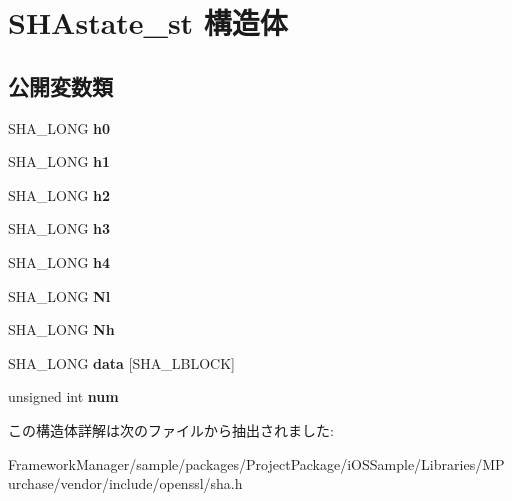 \hypertarget{struct_s_h_astate__st}{}\section{S\+H\+Astate\+\_\+st 構造体}
\label{struct_s_h_astate__st}
\subsection*{公開変数類}
\begin{DoxyCompactItemize}
\item 
\hypertarget{struct_s_h_astate__st_ab3041c8fb56553e66f5e96bea583181c}{}S\+H\+A\+\_\+\+L\+O\+N\+G {\bfseries h0}\label{struct_s_h_astate__st_ab3041c8fb56553e66f5e96bea583181c}

\item 
\hypertarget{struct_s_h_astate__st_aae63de503961d0e23ec45fadbf762a28}{}S\+H\+A\+\_\+\+L\+O\+N\+G {\bfseries h1}\label{struct_s_h_astate__st_aae63de503961d0e23ec45fadbf762a28}

\item 
\hypertarget{struct_s_h_astate__st_a553b3daa14d04597c861e2482d984761}{}S\+H\+A\+\_\+\+L\+O\+N\+G {\bfseries h2}\label{struct_s_h_astate__st_a553b3daa14d04597c861e2482d984761}

\item 
\hypertarget{struct_s_h_astate__st_a5219d68f2bee6867f2775d467691ad24}{}S\+H\+A\+\_\+\+L\+O\+N\+G {\bfseries h3}\label{struct_s_h_astate__st_a5219d68f2bee6867f2775d467691ad24}

\item 
\hypertarget{struct_s_h_astate__st_abd5013d45dc77b9f31df5818e02c80d1}{}S\+H\+A\+\_\+\+L\+O\+N\+G {\bfseries h4}\label{struct_s_h_astate__st_abd5013d45dc77b9f31df5818e02c80d1}

\item 
\hypertarget{struct_s_h_astate__st_abe78332975c3f20418c6a32381904bba}{}S\+H\+A\+\_\+\+L\+O\+N\+G {\bfseries Nl}\label{struct_s_h_astate__st_abe78332975c3f20418c6a32381904bba}

\item 
\hypertarget{struct_s_h_astate__st_aedd943b5d71b31cb22d3a7fecf05575e}{}S\+H\+A\+\_\+\+L\+O\+N\+G {\bfseries Nh}\label{struct_s_h_astate__st_aedd943b5d71b31cb22d3a7fecf05575e}

\item 
\hypertarget{struct_s_h_astate__st_ae8c8b0b2b3c60370a97459696f93e9da}{}S\+H\+A\+\_\+\+L\+O\+N\+G {\bfseries data} \mbox{[}S\+H\+A\+\_\+\+L\+B\+L\+O\+C\+K\mbox{]}\label{struct_s_h_astate__st_ae8c8b0b2b3c60370a97459696f93e9da}

\item 
\hypertarget{struct_s_h_astate__st_a58f39bf4cf04c1f4796f6df5031bc746}{}unsigned int {\bfseries num}\label{struct_s_h_astate__st_a58f39bf4cf04c1f4796f6df5031bc746}

\end{DoxyCompactItemize}


この構造体詳解は次のファイルから抽出されました\+:\begin{DoxyCompactItemize}
\item 
Framework\+Manager/sample/packages/\+Project\+Package/i\+O\+S\+Sample/\+Libraries/\+M\+Purchase/vendor/include/openssl/sha.\+h\end{DoxyCompactItemize}
